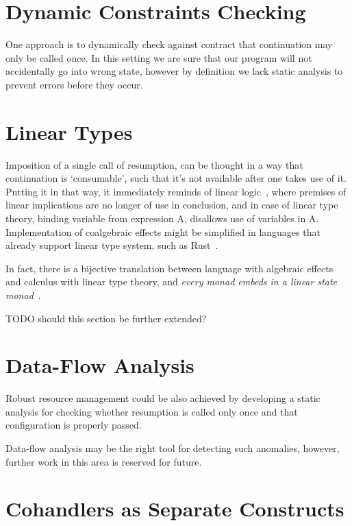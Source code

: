 \documentclass[declaration,shortabstract]{iithesis}
\theoremstyle{definition} \newtheorem{definition}{Definition}[chapter]
\theoremstyle{remark} \newtheorem{remark}[definition]{Observation}
\theoremstyle{plain} \newtheorem{theorem}[definition]{Theorem}
\theoremstyle{plain} \newtheorem{lemma}[definition]{Lemma}
\begin{document}
\section{Dynamic Constraints Checking}

One approach is to dynamically check against contract that continuation may only
be called once. In this setting we are sure that our program will not accidentally
go into wrong state, however by definition we lack static analysis to prevent
errors before they occur.

\section{Linear Types}

Imposition of a single call of resumption, can be thought in a way that continuation
is `consumable', such that it's not available after one takes use of it. Putting
it in that way, it immediately reminds of linear logic~\cite{linear-logic},
where premises of linear implications are no longer of use in conclusion, and
in case of linear type theory, binding variable from expression A, disallows
use of variables in A. Implementation of coalgebraic effects might be simplified
in languages that already support linear type system, such as Rust~\cite{rust}.

In fact, there is a bijective translation between language with algebraic effects
and calculus with linear type theory, and \textit{every monad embeds in a linear
state monad}~\cite{linear-usage-of-state}.

\noindent
TODO should this section be further extended?

\section{Data-Flow Analysis}

Robust resource management could be also achieved by developing a static
analysis for checking whether resumption is called only once and that
configuration is properly passed.

Data-flow analysis may be the right tool for detecting such anomalies, however,
further work in this area is reserved for future.

\section{Cohandlers as Separate Constructs}\label{sec:cohandlers-solution}
\end{document}
